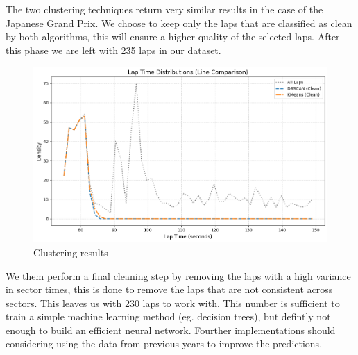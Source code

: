 \documentclass[12pt,a4paper]{article}
\begin{document}
The two clustering techniques return very similar results in the case of the Japanese Grand Prix. We choose to keep only the laps that are classified as clean by both algorithms, this will ensure a higher quality of the selected laps. After this phase we are left with 235 laps in our dataset.
\begin{figure}
    \centering
    \includegraphics[width=1\textwidth]{lap_distribution.png}
    \caption{Clustering results}
    \label{fig:clustered_laps}
\end{figure}
We them perform a final cleaning step by removing the laps with a high variance in sector times, this is done to remove the laps that are not consistent across sectors. This leaves us with 230 laps to work with. This number is sufficient to train a simple machine learning method (eg. decision trees), but defintly not enough to build an efficient neural network. Fourther implementations should considering using the data from previous years to improve the predictions.
\end{document}
